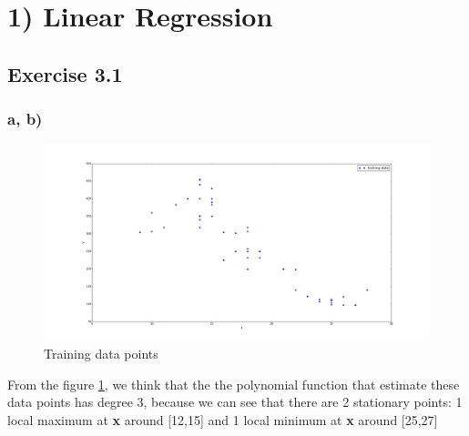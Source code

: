 \documentclass{article}
\begin{document}
\section*{1) Linear Regression}
\subsection*{Exercise 3.1}
\subsubsection*{a, b)}
\begin{figure}[H]
	\centering
	\includegraphics[scale=0.2]{31b.png}
	\caption{Training data points}
	\label{fig1}
\end{figure}

From the figure \ref{fig1}, we think that the the polynomial function that estimate these data points has degree 3, because we can see that there are 2 stationary points: 1 local maximum at \textbf{x} around [12,15] and 1 local minimum at \textbf{x} around [25,27]
\end{document}
